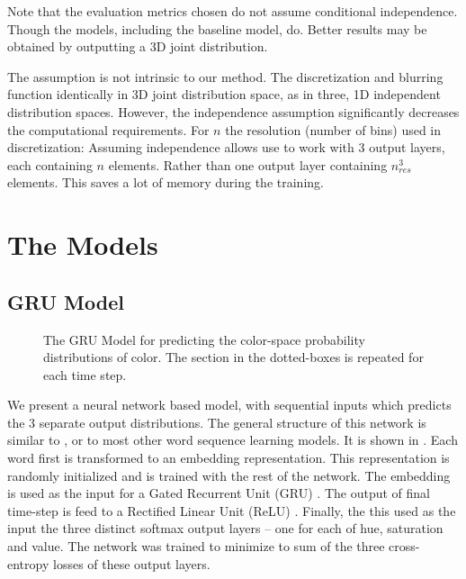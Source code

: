 \documentclass[11pt,letterpaper]{article}
\newcommand{\parencite}{\cite}
\begin{document}
Note that the evaluation metrics chosen do not assume conditional independence.
Though the models, including the baseline model, do.
Better results may be obtained by outputting a 3D joint distribution.

The assumption is not intrinsic to our method.
The discretization and blurring function identically in 3D joint distribution space,
as in three, 1D independent distribution spaces.
However, the independence assumption significantly decreases the computational requirements.
For $n$ the resolution (number of bins) used in discretization:
Assuming independence allows use to work with 3 output layers, each containing $n$ elements.
Rather than one output layer containing $n_{res}^3$ elements.
This saves a lot of memory during the training.


\section{The Models}

\subsection{GRU Model}

\begin{figure}
	\resizebox{\columnwidth}{!}{}

	\caption{\label{network}
		The GRU Model for predicting the color-space probability distributions of color.
		The section in the dotted-boxes is repeated for each time step.
		}
\end{figure}

We present a neural network based model, with sequential inputs which predicts the 3 separate output distributions. The general structure of this network is similar to \cite{2016arXiv160603821M}, or to most other word sequence learning models.
It is shown in .
Each word first is transformed to an embedding representation.
This representation is randomly initialized and is trained with the rest of the network.
The embedding is used as the input for a Gated Recurrent Unit (GRU) \parencite{cho2014properties,chung2014empirical}.
The output of final time-step is feed to a Rectified Linear Unit (ReLU) \parencite{dahl2013reludropout}.
Finally, the this used as the input the three distinct softmax output layers -- one for each of hue, saturation and value.
The network was trained to minimize to sum of the three cross-entropy losses of these output layers.
\end{document}
